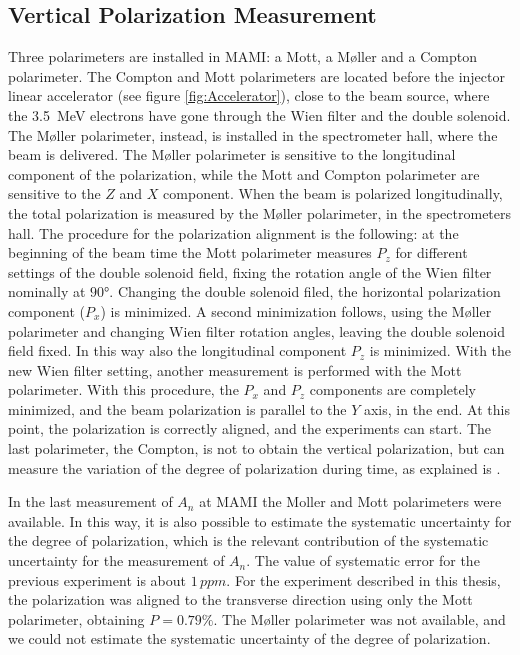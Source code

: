 \subsection{Vertical Polarization Measurement}
Three polarimeters are installed in MAMI: a Mott, a M\o ller and a Compton polarimeter. The Compton and Mott polarimeters are located before the injector linear accelerator (see figure \ref{fig:Accelerator}), close to the beam source, where the \SI{3.5}{\mega \electronvolt} electrons have gone through the Wien filter and the double solenoid. The M\o ller polarimeter, instead, is installed in the spectrometer hall, where the beam is delivered. The M\o ller polarimeter is sensitive to the longitudinal component of the polarization, while the Mott and Compton polarimeter are sensitive to the $Z$ and $X$ component. 
When the beam is polarized longitudinally, the total polarization is measured by the M\o ller polarimeter, in the spectrometers hall. The procedure for the polarization alignment is the following: at the beginning of the beam time the Mott polarimeter measures $P_{z}$ for different settings of the double solenoid field, fixing the rotation angle of the Wien filter nominally at $\ang{90}$. Changing the double solenoid filed, the horizontal polarization component ($P_{x}$) is minimized. A second minimization follows, using the M\o ller polarimeter and changing Wien filter rotation angles, leaving the double solenoid field fixed. In this way also the longitudinal component $P_{z}$ is minimized. With the new Wien filter setting, another measurement is performed with the Mott polarimeter. With this procedure, the $P_{x}$ and $P_{z}$ components are completely minimized, and the beam polarization is parallel to the $Y$ axis, in the end.
At this point, the polarization is correctly aligned, and the experiments can start. The last polarimeter, the Compton, is not to obtain the vertical polarization, but can measure the variation of the degree of polarization during time, as explained is \cite{Schlimme:2016rrp}.

In the last measurement of $A_{n}$ at MAMI \cite{Esser:2018vdp} the Moller and Mott polarimeters were available. In this way, it is also possible to estimate the systematic uncertainty for the degree of polarization, which is the relevant contribution of the systematic uncertainty for the measurement of $A_{n}$. The value of systematic error for the previous experiment is about $1 \, ppm$. For the experiment described in this thesis, the polarization was aligned to the transverse direction using only the Mott polarimeter, obtaining $P = 0.79\%$. The M\o ller polarimeter was not available, and we could not estimate the systematic uncertainty of the degree of polarization.

